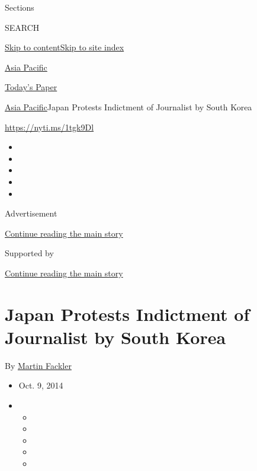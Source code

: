 Sections

SEARCH

\protect\hyperlink{site-content}{Skip to
content}\protect\hyperlink{site-index}{Skip to site index}

\href{https://www.nytimes.com/section/world/asia}{Asia Pacific}

\href{https://myaccount.nytimes.com/auth/login?response_type=cookie\&client_id=vi}{}

\href{https://www.nytimes.com/section/todayspaper}{Today's Paper}

\href{/section/world/asia}{Asia Pacific}\textbar{}Japan Protests
Indictment of Journalist by South Korea

\url{https://nyti.ms/1tgk9Dl}

\begin{itemize}
\item
\item
\item
\item
\item
\end{itemize}

Advertisement

\protect\hyperlink{after-top}{Continue reading the main story}

Supported by

\protect\hyperlink{after-sponsor}{Continue reading the main story}

\hypertarget{japan-protests-indictment-of-journalist-by-south-korea}{%
\section{Japan Protests Indictment of Journalist by South
Korea}\label{japan-protests-indictment-of-journalist-by-south-korea}}

By \href{http://www.nytimes.com/by/martin-fackler}{Martin Fackler}

\begin{itemize}
\item
  Oct. 9, 2014
\item
  \begin{itemize}
  \item
  \item
  \item
  \item
  \item
  \end{itemize}
\end{itemize}

